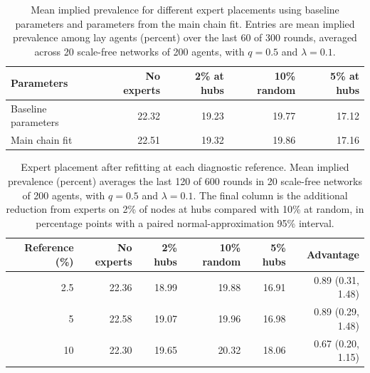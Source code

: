 \begin{table}[htbp]
\centering
\caption{Mean implied prevalence for different expert placements using baseline parameters and parameters from the main chain fit. Entries are mean implied prevalence among lay agents (percent) over the last 60 of 300 rounds, averaged across 20 scale-free networks of 200 agents, with $q=0.5$ and $\lambda=0.1$.}
\label{tab:calibration}
\begin{tabular}{lrrrr}
\toprule
Parameters & No experts & 2\% at hubs & 10\% random & 5\% at hubs \\
\midrule
Baseline parameters & 22.32 & 19.23 & 19.77 & 17.12 \\
Main chain fit & 22.51 & 19.32 & 19.86 & 17.16 \\
\bottomrule\end{tabular}\end{table}

\begin{table}[htbp]
\centering
\caption{Expert placement after refitting at each diagnostic reference. Mean implied prevalence (percent) averages the last 120 of 600 rounds in 20 scale-free networks of 200 agents, with $q=0.5$ and $\lambda=0.1$. The final column is the additional reduction from experts on 2\% of nodes at hubs compared with 10\% at random, in percentage points with a paired normal-approximation 95\% interval.}
\label{tab:reference_network}
\begingroup\small\setlength{\tabcolsep}{4pt}
\begin{tabular}{rrrrrr}
\toprule
Reference (\%) & No experts & 2\% hubs & 10\% random & 5\% hubs & Advantage \\
\midrule
2.5 & 22.36 & 18.99 & 19.88 & 16.91 & 0.89 (0.31, 1.48) \\
5 & 22.58 & 19.07 & 19.96 & 16.98 & 0.89 (0.29, 1.48) \\
10 & 22.30 & 19.65 & 20.32 & 18.06 & 0.67 (0.20, 1.15) \\
\bottomrule
\end{tabular}\endgroup
\end{table}

